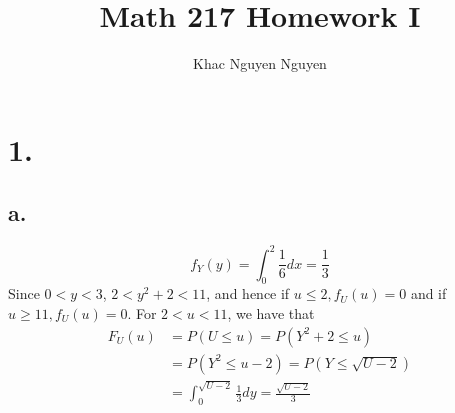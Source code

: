 \documentclass[11pt]{article}
\title{\textbf{Math 217 Homework I}}
\author{Khac Nguyen Nguyen}
\date{}
\begin{document}
\section*{1.}
\subsection*{a.}
\[
    f_Y(y) = \int_0^2 \frac{1}{6}dx = \frac{1}{3} 
\]
Since $0<y<3$, $2<y^2 +2<11$, and hence if $u\le 2, f_U(u) = 0$ and if $u \ge 11, f_U(u) = 0$. For $2<u<11$, we have that
\begin{equation*}
    \begin{aligned}
        F_U(u) &= P(U\le u) = P(Y^2+2 \le u) \\
        &= P(Y^2 \le u-2) = P(Y \le \sqrt{U-2}) \\
        &= \int^{\sqrt{U-2}}_0 \frac{1}{3}dy = \frac{\sqrt{U-2}}{3}
    \end{aligned}
\end{equation*}
\end{document}
